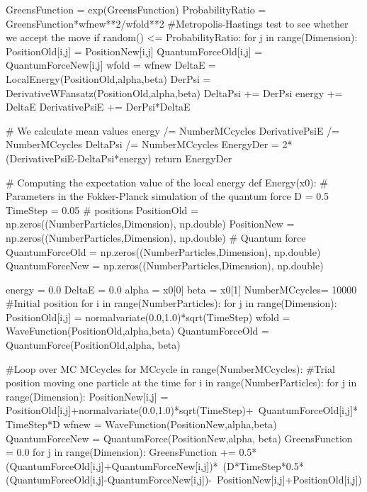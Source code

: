 \documentclass[%
oneside,                 %
final,                   %
10pt]{article}
\begin{document}
            GreensFunction = exp(GreensFunction)
            ProbabilityRatio = GreensFunction*wfnew**2/wfold**2
            #Metropolis-Hastings test to see whether we accept the move
            if random() <= ProbabilityRatio:
                for j in range(Dimension):
                    PositionOld[i,j] = PositionNew[i,j]
                    QuantumForceOld[i,j] = QuantumForceNew[i,j]
                wfold = wfnew
        DeltaE = LocalEnergy(PositionOld,alpha,beta)
        DerPsi = DerivativeWFansatz(PositionOld,alpha,beta)
        DeltaPsi += DerPsi
        energy += DeltaE
        DerivativePsiE += DerPsi*DeltaE
            
    # We calculate mean values
    energy /= NumberMCcycles
    DerivativePsiE /= NumberMCcycles
    DeltaPsi /= NumberMCcycles
    EnergyDer  = 2*(DerivativePsiE-DeltaPsi*energy)
    return EnergyDer


# Computing the expectation value of the local energy 
def Energy(x0):
    # Parameters in the Fokker-Planck simulation of the quantum force
    D = 0.5
    TimeStep = 0.05
    # positions
    PositionOld = np.zeros((NumberParticles,Dimension), np.double)
    PositionNew = np.zeros((NumberParticles,Dimension), np.double)
    # Quantum force
    QuantumForceOld = np.zeros((NumberParticles,Dimension), np.double)
    QuantumForceNew = np.zeros((NumberParticles,Dimension), np.double)

    energy = 0.0
    DeltaE = 0.0
    alpha = x0[0]
    beta = x0[1]
    NumberMCcycles= 10000
    #Initial position
    for i in range(NumberParticles):
        for j in range(Dimension):
            PositionOld[i,j] = normalvariate(0.0,1.0)*sqrt(TimeStep)
    wfold = WaveFunction(PositionOld,alpha,beta)
    QuantumForceOld = QuantumForce(PositionOld,alpha, beta)

    #Loop over MC MCcycles
    for MCcycle in range(NumberMCcycles):
        #Trial position moving one particle at the time
        for i in range(NumberParticles):
            for j in range(Dimension):
                PositionNew[i,j] = PositionOld[i,j]+normalvariate(0.0,1.0)*sqrt(TimeStep)+\
                                       QuantumForceOld[i,j]*TimeStep*D
            wfnew = WaveFunction(PositionNew,alpha,beta)
            QuantumForceNew = QuantumForce(PositionNew,alpha, beta)
            GreensFunction = 0.0
            for j in range(Dimension):
                GreensFunction += 0.5*(QuantumForceOld[i,j]+QuantumForceNew[i,j])*\
	                              (D*TimeStep*0.5*(QuantumForceOld[i,j]-QuantumForceNew[i,j])-\
                                      PositionNew[i,j]+PositionOld[i,j])
      
\end{document}
